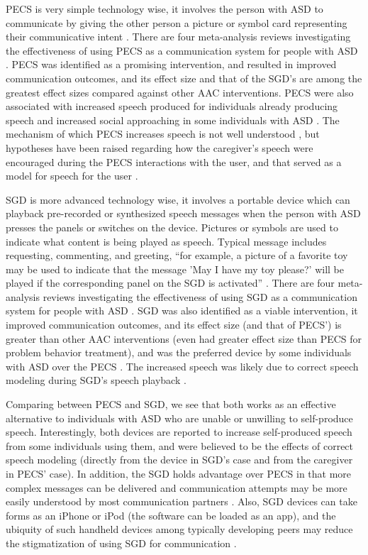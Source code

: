 \documentclass{ut-thesis}
\begin{document}
PECS is very simple technology wise, it involves the person with ASD to communicate by giving the other person a picture or symbol card representing their communicative intent \cite{bondy1994picture}.  There are four meta-analysis reviews investigating the effectiveness of using PECS as a communication system for people with ASD \cite{ganz2012meta, ganz2012metab, sulzer2009picture, tincani2010quantitative}.  PECS was identified as a promising intervention, and resulted in improved communication outcomes, and its effect size and that of the SGD's are among the greatest effect sizes compared against other AAC interventions.  PECS were also associated with increased speech produced for individuals already producing speech and increased social approaching in some individuals with ASD \cite{lang2014assistive}.  The mechanism of which PECS increases speech is not well understood \cite{preston2009review}, but hypotheses have been raised regarding how the caregiver's speech were encouraged during the PECS interactions with the user, and that served as a model for speech for the user \cite{yoder2006randomized}.

SGD is more advanced technology wise, it involves a portable device which can playback pre-recorded or synthesized speech messages when the person with ASD presses the panels or switches on the device.  Pictures or symbols are used to indicate what content is being played as speech.  Typical message includes requesting, commenting, and greeting, ``for example, a picture of a favorite toy may be used to indicate that the message 'May I have my toy please?' will be played if the corresponding panel on the SGD is activated'' \cite{lang2014assistive}.  There are four meta-analysis reviews investigating the effectiveness of using SGD as a communication system for people with ASD \cite{van2010communication, van2011assessing, ganz2012metab, ganz2013moderation}.  SGD was also identified as a viable intervention, it improved communication outcomes, and its effect size (and that of PECS') is greater than other AAC interventions (even had greater effect size than PECS for problem behavior treatment), and was the preferred device by some individuals with ASD over the PECS \cite{lang2014assistive}.  The increased speech was likely due to correct speech modeling during SGD's speech playback \cite{schlosser2008effects}.

Comparing between PECS and SGD, we see that both works as an effective alternative to individuals with ASD who are unable or unwilling to self-produce speech.  Interestingly, both devices are reported to increase self-produced speech from some individuals using them, and were believed to be the effects of correct speech modeling (directly from the device in SGD's case and from the caregiver in PECS' case).  In addition, the SGD holds advantage over PECS in that more complex messages can be delivered and communication attempts may be more easily understood by most communication partners \cite{mirenda2001autism}.  Also, SGD devices can take forms as an iPhone or iPod (the software can be loaded as an app), and the ubiquity of such handheld devices among typically developing peers may reduce the stigmatization of using SGD for communication \cite{kagohara2013using}.
\end{document}
